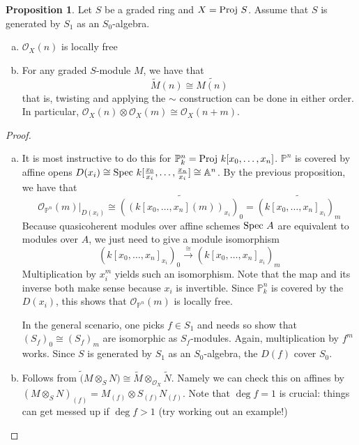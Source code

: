\documentclass[10pt,reqno]{amsart}
\theoremstyle{definition}
\newtheorem{proposition}[theorem]{Proposition}
\theoremstyle{remark}
\numberwithin{equation}{section}
\numberwithin{theorem}{section}
\newcommand{\OO}{{\mathcal O}}
\newcommand{\spec}{\textup{Spec }}
\newcommand{\proj}{\textup{Proj }}
\newcommand{\wt}{\widetilde}
\newcommand{\A}{{\mathbb A}}
\newcommand{\PP}{{\mathbb P}}
\begin{document}
\begin{proposition} Let $S$ be a graded ring and $X = \proj S$. Assume that $S$ is generated by $S_1$ as an $S_0$-algebra.
\begin{enumerate}[(a)]
\item $\OO_X(n)$ is locally free
\item For any graded $S$-module $M$, we have that
\[\wt{M}(n) \cong \wt{M(n)}\]
that is, twisting and applying the $\sim$ construction can be done in either order. In particular, $\OO_X(n) \otimes \OO_X(m) \cong \OO_X(n+m)$.
\end{enumerate}
\end{proposition}
\begin{proof}
\begin{enumerate}[(a)]
\item It is most instructive to do this for $\PP^n_k = \proj k[x_0,\dots,x_n]$. $\PP^n$ is covered by affine opens $D(x_i) \cong \spec k[\frac{x_0}{x_i},\dots,\frac{x_n}{x_i}] \cong \A^n$. By the previous proposition, we have that
\[\OO_{\PP^n}(m)|_{D(x_i)} \cong \wt{((k[x_0,\dots,x_n](m))_{x_i})_0} = \wt{(k[x_0,\dots,x_n]_{x_i})_m}\]
Because quasicoherent modules over affine schemes $\spec A$ are equivalent to modules over $A$, we just need to give a module isomorphism
\[(k[x_0,\dots,x_n]_{x_i})_0 \stackrel{\cong}{\longrightarrow} (k[x_0,\dots,x_n]_{x_i})_m\]
Multiplication by $x_i^m$ yields such an isomorphism. Note that the map and its inverse both make sense because $x_i$ is invertible. Since $\PP^n_k$ is covered by the $D(x_i)$, this shows that $\OO_{\PP^n}(m)$ is locally free.

In the general scenario, one picks $f \in S_1$ and needs so show that $(S_f)_0 \cong (S_f)_m$ are isomorphic as $S_f$-modules. Again, multiplication by $f^m$ works. Since $S$ is generated by $S_1$ as an $S_0$-algebra, the $D(f)$ cover $S_0$.
\item Follows from $\wt(M \otimes_S N) \cong \wt{M} \otimes_{\OO_X} \wt{N}$. Namely we can check this on affines by $(M \otimes_S N)_{(f)} = M_{(f)} \otimes S_{(f)} N_{(f)}$. Note that $\deg f = 1$ is crucial: things can get messed up if $\deg f > 1$ (try working out an example!)
\end{enumerate}
\end{proof}
\end{document}
